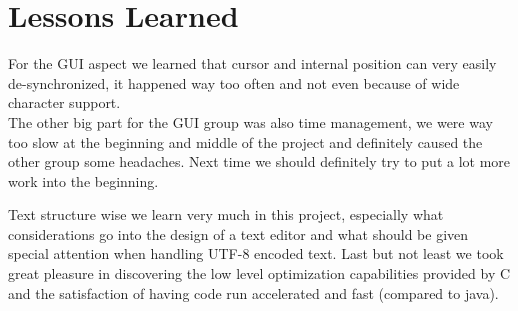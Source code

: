 \section{Lessons Learned}\label{sec:lessons}
For the GUI aspect we learned that cursor and internal position can very easily de-synchronized, it happened way too often and not even because of wide character support.
\\The other big part for the GUI group was also time management, we were way too slow at the beginning and middle of the project and definitely caused the other group some headaches. Next time we should definitely try to put a lot more work into the beginning.
\medskip

Text structure wise we learn very much in this project, especially  what considerations go into the design of a text editor and what should be given special attention when handling UTF-8 encoded text. Last but not least we took great pleasure in discovering the low level optimization capabilities provided by C and the satisfaction of having code run accelerated and fast (compared to java).